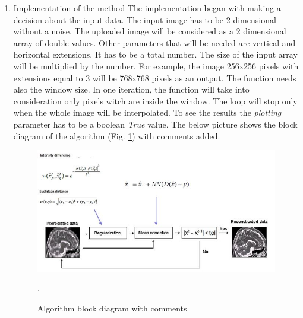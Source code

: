 \begin{enumerate}
Patch-based non-local regularization is used to reconstruct new voxels. The voxel under study is reconstruced using all similar voxels which are placed inside the patch. Contrary to classical techniques which use local neighbourhood of the reconstructed voxel, the proposed method uses the only relevant information, the context of the voxel.

Another step in the algorithm diagram (Fig. \ref{fig: Module9_1}) is mean correction. It has to be applied to ensure that the downsampled reconstructed HR $X$ image is equal to the original $y$ LR one. Thus the local mean value of $X$ fits with the value of the $y$ by adding the corresponding offset.

\centerline{$X=X+NN*(D(X)-y)$, where}


$D$ is an operator that downsamples HR into original LR,
\newline $NN$ is a Nearest Neighbour operator that interpolates LR image to HR.

The Regularization and Correction steps are repeated until no important difference between two consecutive reconstructions. Tolerance is determined by Mean Absolute Difference .

\item Implementation of the method
\newline
The implementation began with making a decision about the input data. The input image has to be 2 dimensional without a noise. The uploaded image will be considered as a 2 dimensional array of double values. Other parameters that will be needed are vertical and horizontal extensions. It has to be a total number. The size of the input array will be multiplied by the number. For example, the image 256x256 pixels with extensions equal to 3 will be 768x768 pixels as an output. The function needs also the window size. In one iteration, the function will take into consideration only pixels witch are inside the window. The loop will stop only when the whole image will be interpolated. To see the results the \textit{plotting} parameter has to be a boolean \textit{True} value. 
\newline The below picture shows the block diagram of the algorithm (Fig. \ref{fig: Module10_4}) with comments added.

\begin{figure}[H]
\centering{}\includegraphics[scale=0.7]{figures/Module_10/Module10_4}\caption{Algorithm block diagram with comments}. 
\label{fig: Module10_4}
\end{figure}


\end{enumerate}
